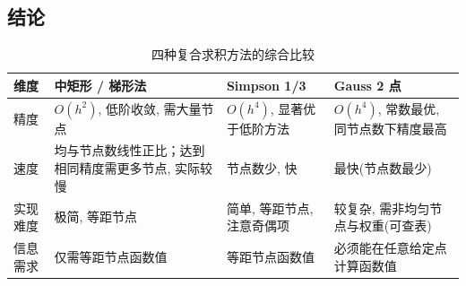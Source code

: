 \documentclass[12pt,a4paper]{ctexart}
\begin{document}
\subsection{结论}
\begin{table}[H]
    \centering
    \caption{四种复合求积方法的综合比较}
    \label{tab:compare}
    \begin{tabular}{p{2.5cm}p{3.5cm}p{3.5cm}p{3.5cm}}
        \toprule
        维度 & 中矩形 / 梯形法 & Simpson 1/3 & Gauss 2 点 \\
        \midrule
        精度 & $O(h^2)$, 低阶收敛, 需大量节点 & $O(h^4)$, 显著优于低阶方法 & $O(h^4)$, 常数最优, 同节点数下精度最高 \\
        速度 & 均与节点数线性正比；达到相同精度需更多节点, 实际较慢 & 节点数少, 快 & 最快(节点数最少) \\
        实现难度 & 极简, 等距节点 & 简单, 等距节点, 注意奇偶项 & 较复杂, 需非均匀节点与权重(可查表) \\
        信息需求 & 仅需等距节点函数值 & 等距节点函数值 & 必须能在任意给定点计算函数值 \\
    \bottomrule
    \end{tabular}
\end{table}
\appendix
\end{document}
